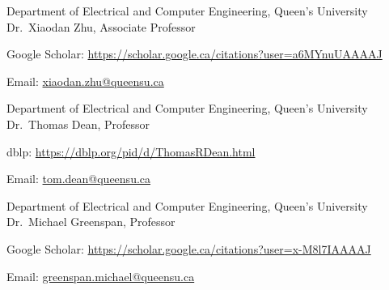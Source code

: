 

\begin{cventries}

  \cventry
    {Department of Electrical and Computer Engineering, Queen's University} %
    {Dr.~Xiaodan Zhu, Associate Professor} %
    {} %
    {} %
    {
      \begin{cvitems} %
        \item {Google Scholar: \href{https://scholar.google.ca/citations?user=a6MYnuUAAAAJ&hl=en}{https://scholar.google.ca/citations?user=a6MYnuUAAAAJ}}
        \item {Email: \href{mailto:xiaodan.zhu@queensu.ca}{xiaodan.zhu@queensu.ca}}
      \end{cvitems}
    }

  \cventry
    {Department of Electrical and Computer Engineering, Queen's University} %
    {Dr.~Thomas Dean, Professor} %
    {} %
    {} %
    {
      \begin{cvitems} %
        \item {dblp: \href{https://dblp.org/pid/d/ThomasRDean.html}{https://dblp.org/pid/d/ThomasRDean.html}}
        \item {Email: \href{mailto:tom.dean@queensu.ca}{tom.dean@queensu.ca}}
      \end{cvitems}
    }

  \cventry
    {Department of Electrical and Computer Engineering, Queen's University} %
    {Dr.~Michael Greenspan, Professor} %
    {} %
    {} %
    {
      \begin{cvitems} %
        \item {Google Scholar: \href{https://scholar.google.ca/citations?user=x-M8l7IAAAAJ&hl=en}{https://scholar.google.ca/citations?user=x-M8l7IAAAAJ}}
        \item {Email: \href{mailto:greenspan.michael@queensu.ca}{greenspan.michael@queensu.ca}}
      \end{cvitems}
    }


\end{cventries}

